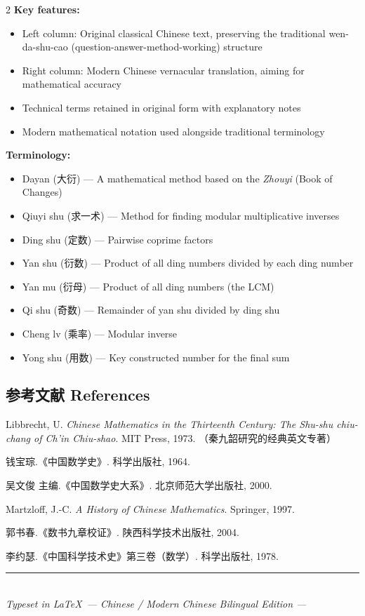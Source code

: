 \documentclass[11pt,a4paper]{article}
\newcommand{\zhtext}[1]{{\chinese #1}}
\begin{document}
\begin{paracol}{2}
\textbf{Key features:}
\begin{itemize}[topsep=0pt,parsep=0pt]
  \item Left column: Original classical Chinese text, preserving the traditional \zhtext{wen-da-shu-cao} (question-answer-method-working) structure
  \item Right column: Modern Chinese vernacular translation, aiming for mathematical accuracy
  \item Technical terms retained in original form with explanatory notes
  \item Modern mathematical notation used alongside traditional terminology
\end{itemize}

\textbf{Terminology:}
\begin{itemize}[topsep=0pt,parsep=0pt]
  \item Dayan (\zhtext{大衍}) --- A mathematical method based on the \textit{Zhouyi} (Book of Changes)
  \item Qiuyi shu (\zhtext{求一术}) --- Method for finding modular multiplicative inverses
  \item Ding shu (\zhtext{定数}) --- Pairwise coprime factors
  \item Yan shu (\zhtext{衍数}) --- Product of all ding numbers divided by each ding number
  \item Yan mu (\zhtext{衍母}) --- Product of all ding numbers (the LCM)
  \item Qi shu (\zhtext{奇数}) --- Remainder of yan shu divided by ding shu
  \item Cheng lv (\zhtext{乘率}) --- Modular inverse
  \item Yong shu (\zhtext{用数}) --- Key constructed number for the final sum
\end{itemize}

\end{paracol}

\vspace{1em}
\subsection*{\zhtext{参考文献} References}

\begin{enumerate}[label={[\arabic*]},topsep=2pt,parsep=2pt]
  \item Libbrecht, U. \textit{Chinese Mathematics in the Thirteenth Century: The Shu-shu chiu-chang of Ch'in Chiu-shao}. MIT Press, 1973. （秦九韶研究的经典英文专著）
  \item 钱宝琮.《中国数学史》. 科学出版社, 1964.
  \item 吴文俊 主编.《中国数学史大系》. 北京师范大学出版社, 2000.
  \item Martzloff, J.-C. \textit{A History of Chinese Mathematics}. Springer, 1997.
  \item 郭书春.《数书九章校证》. 陕西科学技术出版社, 2004.
  \item 李约瑟.《中国科学技术史》第三卷（数学）. 科学出版社, 1978.
\end{enumerate}

\vfill
\begin{center}
\textcolor{rulecolor}{\rule{0.5\textwidth}{0.4pt}}\\[0.5em]
\textit{Typeset in \LaTeX\ --- Chinese / Modern Chinese Bilingual Edition --- \the\year}
\end{center}
\end{document}
